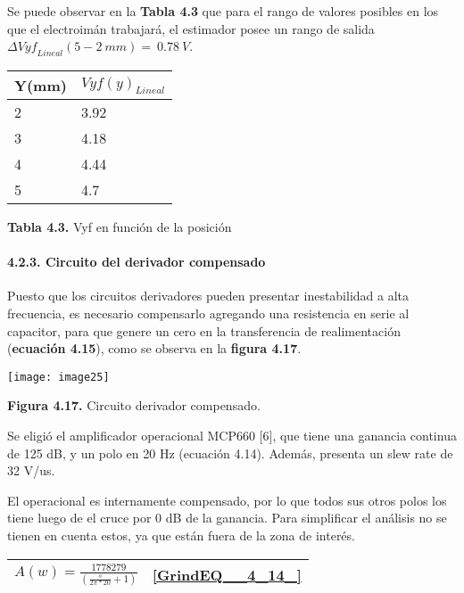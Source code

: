 \documentclass{article} %
\begin{document}
\noindent Se puede observar en la \textbf{Tabla 4.3} que para el rango de valores posibles en los que el electroim\'{a}n trabajar\'{a}, el estimador posee un rango de salida ${\mathit{\Delta}{Vyf}_{Lineal}}(5-2\ mm)=\ 0.78\ V$.

\noindent 

\begin{tabular}{|p{2.1in}|p{2.1in}|} \hline 
Y(mm) & ${Vyf(y)}_{Lineal}$ \\ \hline 
2 & 3.92 \\ \hline 
3 & 4.18 \\ \hline 
4 & 4.44 \\ \hline 
5 & 4.7 \\ \hline 
\end{tabular}

\textbf{Tabla 4.3. }Vyf en funci\'{o}n de la posici\'{o}n

\noindent 
\paragraph{4.2.3. Circuito del derivador compensado}

\noindent Puesto que los circuitos derivadores pueden presentar inestabilidad a alta frecuencia, es necesario compensarlo agregando una resistencia en serie al capacitor, para que genere un cero en la transferencia de realimentaci\'{o}n (\textbf{ecuaci\'{o}n 4.15}), como se observa en la \textbf{figura 4.17}. 

\noindent 

\noindent \texttt{[image: image25]}

\noindent \textbf{Figura 4.17.} Circuito derivador compensado.

\noindent 

\noindent Se eligi\'{o} el amplificador operacional MCP660 [6], que tiene una ganancia continua de 125 dB, y un polo en 20 Hz (ecuaci\'{o}n 4.14). Adem\'{a}s, presenta un slew rate de 32 V/us.

\noindent 

\noindent El operacional es internamente compensado, por lo que todos sus otros polos los tiene luego de el cruce por 0 dB de la ganancia. Para simplificar el an\'{a}lisis no se tienen en cuenta estos, ya que est\'{a}n fuera de la zona de inter\'{e}s. 

\noindent 

\begin{tabular}{|p{3.9in}|p{0.5in}|} \hline 
$A(w)=\frac{1778279}{(\frac{s}{2\pi *20}+1)}$ & \eqref{GrindEQ__4_14_}  \\ \hline 
\end{tabular}
\end{document}
